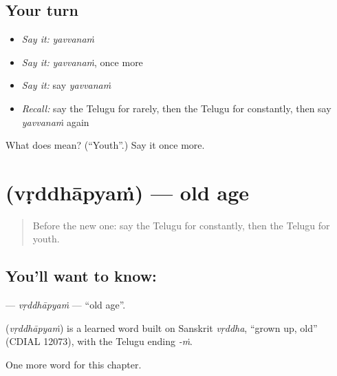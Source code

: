 \subsection*{Your turn}
\begin{itemize}
\raggedright
  \item \emph{Say it:} \emph{yavvanaṁ}
  \item \emph{Say it:} \emph{yavvanaṁ}, once more
  \item \emph{Say it:} say \emph{yavvanaṁ}
  \item \emph{Recall:} say the Telugu for rarely, then the Telugu for constantly, then say \emph{yavvanaṁ} again
\end{itemize}

\begin{tcolorbox}[breakable,colback=teal!4,colframe=teal!35!black,title={Before you move on}]
What does  mean? (\textquotedblleft{}Youth\textquotedblright{}.) Say it once more.
\end{tcolorbox}
\section[\texorpdfstring{\te{వృద్ధాప్యం} (vṛddhāpyaṁ)}{వృద్ధాప్యం (vṛddhāpyaṁ)}]{ (vṛddhāpyaṁ) — old age}

\label{lesson:TE-C172-vrddhapyam}



\begin{quote}
Before the new one: say the Telugu for constantly, then the Telugu for youth.
\end{quote}

\subsection*{You'll want to know: }
\textbf{} — \emph{vṛddhāpyaṁ} — \textquotedblleft{}old age\textquotedblright{}.

\begin{cousinweb}
\textbf{} (\emph{vṛddhāpyaṁ}) is a learned word built on Sanskrit \emph{vṛddha}, \textquotedblleft{}grown up, old\textquotedblright{} (CDIAL 12073), with the Telugu ending \emph{-ṁ}.
\end{cousinweb}

\begin{grammarlens}[title={What you've built}]
One more word for this chapter.
\end{grammarlens}

